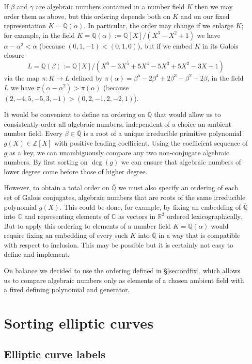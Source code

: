 \documentclass{article}
\theoremstyle{remark}
\def\Z{{\mathbb Z}}
\def\Q{{\mathbb Q}}
\def\R{{\mathbb R}}
\def\C{{\mathbb C}}
\def\Qbar{\overline{\Q}}
\begin{document}
If $\beta$ and $\gamma$ are algebraic numbers contained in a number
field $K$ then we may order them as above, but this ordering depends
both on $K$ and on our fixed representation $K=\Q(\alpha)$.  In
particular, the order may change if we enlarge $K$; for example, in
the field $K=\Q(\alpha):=\Q[X]/(X^3-X^2+1)$ we have $\alpha-\alpha^2 <
\alpha$ (because $(0,1,-1) < (0,1,0)$), but if we embed $K$ in its
Galois closure $$L=\Q(\beta):=\Q[X]/(X^6 - 3X^5 + 5X^4 - 5X^3 + 5X^2 -
3X + 1)$$ via the map $\pi:K\to L$ defined by $\pi(\alpha) = \beta^5 -
2\beta^4 + 2\beta^3 - \beta^2 + 2\beta$, in the field $L$ we have
$\pi(\alpha-\alpha^2) > \pi(\alpha)$ (because
$(2,-4,5,-5,3,-1)>(0,2,-1,2,-2,1)$).

It would be convenient to define an ordering on $\Qbar$ that would
allow us to consistently order all algebraic numbers, independent of a
choice an ambient number field.  Every $\beta\in\Qbar$ is a root of a
unique irreducible primitive polynomial $g(X)\in\Z[X]$ with positive
leading coefficient.  Using the coefficient sequence of $g$ as a key,
we can unambiguously compare any two non-conjugate algebraic
numbers. By first sorting on $\deg(g)$ we can ensure that algebraic
numbers of lower degree come before those of higher degree.

However, to obtain a total order on $\Qbar$ we must also specify an
ordering of each set of Galois conjugates, algebraic numbers that are
roots of the same irreducible polynomial $g(X)$.  This could be done,
for example, by fixing an embedding of $\Qbar$ into $\C$ and
representing elements of $\C$ as vectors in $\R^2$ ordered
lexicographically. But to apply this ordering to elements of a number
field $K=\Q(\alpha)$ would require fixing an embedding of every such
$K$ into $\Qbar$ in a way that is compatible with respect to
inclusion.  This may be possible but it is certainly not easy to
define and implement.

On balance we decided to use the ordering defined in
\S\ref{sec:ordfix}, which allows us to compare algebraic numbers only
as elements of a chosen ambient field with a fixed defining polynomial
and generator.


\section{Sorting elliptic curves}
\label{sec:isog-curves}
\subsection{Elliptic curve labels}
\end{document}
